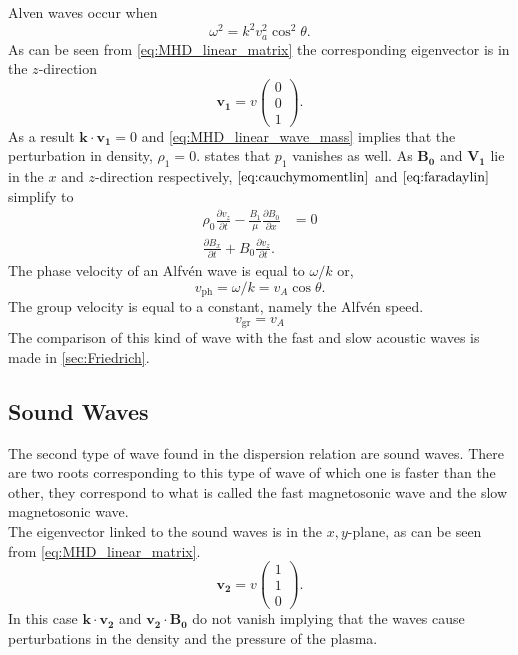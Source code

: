\documentclass[a4paper]{article}
\begin{document}
Alven waves occur when \[
\omega^2 = k^2v_a^2\cos^2 \theta
.\] 
As can be seen from \cref{eq:MHD_linear_matrix} the corresponding eigenvector is in the $z$-direction \[
	\mathbf{v_1} = v \begin{pmatrix} 0 \\ 0 \\ 1 \end{pmatrix} 
.\] 
As a result $\mathbf k \cdot \mathbf{v_1} = 0$ and \cref{eq:MHD_linear_wave_mass} implies that the perturbation in density, $\rho_1  = 0$.  states that $p_1$ vanishes as well. 
As $\mathbf{B_0}$  and $\mathbf{V_1}$ lie in the $x$ and $z$-direction respectively, $\cref{eq:cauchymomentlin}$ and $\cref{eq:faradaylin}$ simplify to
\begin{align*}
	\rho_0 \frac{\partial v_z}{\partial t} - \frac{B_1}{\mu} \frac{\partial B_0}{\partial x} &= 0 \\
	\frac{\partial B_x}{\partial t}  + B_0\frac{\partial v_z}{\partial t} 
.\end{align*}
The phase velocity of an Alfv\'en wave is equal to $\omega/k$ or,
\begin{equation*}
    v_{\text{ph}} = \omega/k = v_A \cos\theta.
\end{equation*}
The group velocity is equal to a constant, namely the Alfv\'en speed.
\begin{equation*}
    v_{\text{gr}} = v_A
\end{equation*}
The comparison of this kind of wave with the fast and slow acoustic waves is made in \cref{sec:Friedrich}.
\subsection{Sound Waves}
The second type of wave found in the dispersion relation are sound waves. There are two roots corresponding to this type of wave of which one is faster than the other, they correspond to what is called the fast magnetosonic wave and the slow magnetosonic wave.\\

The eigenvector linked to the sound waves is in the $x,y$-plane, as can be seen from \cref{eq:MHD_linear_matrix}.
\[
	\mathbf{v_2} = v \begin{pmatrix} 1 \\ 1 \\ 0 \end{pmatrix} 
.\] 
In this case $\mathbf{k\cdot v_2}$ and $\mathbf{v_2 \cdot B_0}$ do not vanish implying that the waves cause perturbations in the density and the pressure of the plasma.
\end{document}
